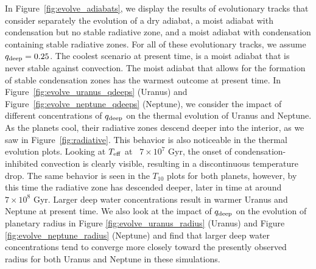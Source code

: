 \documentclass[11pt]{ucscthesisbs}
\begin{document}
In Figure~\ref{fig:evolve_adiabats}, we display the results of evolutionary tracks that consider separately the evolution of a dry adiabat, a moist adiabat with condensation but no stable radiative zone, and a moist adiabat with condensation containing stable radiative zones. For all of these evolutionary tracks, we assume $q_{\rm deep} = 0.25$. The coolest scenario at present time, is a moist adiabat that is never stable against convection. The moist adiabat that allows for the formation of stable condensation zones has the warmest outcome at present time. In Figure~\ref{fig:evolve_uranus_qdeeps} (Uranus) and Figure~\ref{fig:evolve_neptune_qdeeps} (Neptune), we consider the impact of different concentrations of $q_{\rm deep}$ on the thermal evolution of Uranus and Neptune. As the planets cool, their radiative zones descend deeper into the interior, as we saw in Figure~\ref{fig:radiative}. This behavior is also noticeable in the thermal evolution plots. Looking at $T_{\rm eff}$ at ~$7 \times 10^7$ Gyr, the onset of condensation-inhibited convection is clearly visible, resulting in a discontinuous temperature drop. The same behavior is seen in the $T_{10}$ plots for both planets, however, by this time the radiative zone has descended deeper, later in time at around ~$7 \times 10^8$ Gyr. Larger deep water concentrations result in warmer Uranus and Neptune at present time. We also look at the impact of $q_{\rm deep}$ on the evolution of planetary radius in Figure \ref{fig:evolve_uranus_radius} (Uranus) and Figure \ref{fig:evolve_neptune_radius} (Neptune) and find that larger deep water concentrations tend to converge more closely toward the presently observed radius for both Uranus and Neptune in these simulations. 
\end{document}
